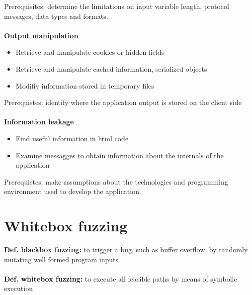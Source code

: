 \documentclass[10pt,a4paper]{article}
\begin{document}
Prerequisites: determine the limitations on input variable length, protocol messages, data types and formats.\\\\
\textbf{Output manipulation}
\begin{itemize}
\item Retrieve and manipulate cookies or hidden fields
\item Retrieve and manipulate cached information, serialized objects
\item Modifiy information stored in temporary files
\end{itemize}
Prerequistes: identify where the application output is stored on the client side\\\\
\textbf{Information leakage}
\begin{itemize}
\item Find useful information in html code
\item Examine messagges to obtain information about the internals of the application
\end{itemize}
Prerequistes: make assumptions about the technologies and programming environment used to develop the application.
\newpage
\section{Whitebox fuzzing}
\textbf{Def. blackbox fuzzing:} to trigger a bug, such as buffer overflow, by randomly mutating well formed program inputs\\\\
\textbf{Def. whitebox fuzzing:} to execute all feasible paths by means of symbolic execution
\end{document}
